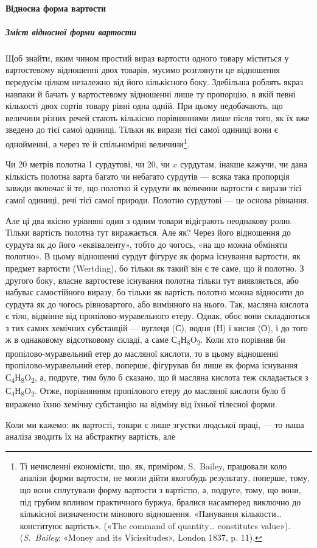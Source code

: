 
\paragraph{Відносна форма вартости}

\subparagraph{Зміст відносної форми вартости}

Щоб знайти, яким чином простий вираз вартости одного товару
міститься у вартостевому відношенні двох товарів, мусимо
розглянути це відношення передусім цілком незалежно від його
кількісного боку. Здебільша роблять якраз навпаки й бачать у
вартостевому відношенні лише ту пропорцію, в якій певні кількості
двох сортів товару рівні одна одній. При цьому недобачають,
що величини різних речей стають кількісно порівнянними
лише після того, як їх вже зведено до тієї самої одиниці. Тільки
як вирази тієї самої одиниці вони є однойменні, а через те й спільномірні
величини\footnote{
Ті нечисленні економісти, що, як, приміром, S.~Bailey, працювали
коло аналізи форми вартости, не могли дійти якогобудь результату,
поперше, тому, що вони сплутували форму вартости з вартістю, а, подруге,
тому, що вони, під грубим впливом практичного буржуа, бралися насамперед
виключно до кількісної визначености мінового відношення. «Панування
кількости\dots{} конституює вартість». («The command of quantity\dots{}
constitutes value»). (\emph{S.~Bailey}: «Money and its Vicissitudes», London
1837, p. 11).
}.

Чи 20 метрів полотна \deq{} 1 сурдутові, чи 20, чи $x$ сурдутам,
інакше кажучи, чи дана кількість полотна варта багато чи небагато
сурдутів — всяка така пропорція завжди включає й те, що
полотно й сурдути як величини вартости є вирази тієї самої одиниці,
речі тієї самої природи. Полотно \deq{} сурдутові — це основа
рівнання.

Але ці два якісно урівняні один з одним товари відіграють
неоднакову ролю. Тільки вартість полотна тут виражається. Але
як? Через його відношення до сурдута як до його «еквіваленту»,
тобто до чогось, «на що можна обміняти полотно». В цьому відношенні
сурдут фігурує як форма існування вартости, як предмет
вартости (Wertding), бо тільки як такий він є те саме, що й полотно.
З другого боку, власне вартостеве існування полотна
тільки тут виявляється, або набуває самостійного виразу, бо
тільки як вартість полотно можна відносити до сурдута як до
чогось рівновартого, або вимінного на нього. Так, масляна кислота
є тіло, відмінне від пропілово-муравельного етеру. Однак, обоє
вони складаються з тих самих хемічних субстанцій — вуглеця
(С), водня (Н) і кисня (О), і до того ж в однаковому відсотковому
складі, а саме С\textsubscript{4}Н\textsubscript{8}O\textsubscript{2}.
Коли хто порівняв би пропілово-муравельний
етер до масляної кислоти, то в цьому відношенні пропілово-муравельний
етер, поперше, фігурував би лише як форма
існування С\textsubscript{4}Н\textsubscript{8}O\textsubscript{2},
а, подруге, тим було б сказано, що й масляна
кислота теж складається з С\textsubscript{4}Н\textsubscript{8}O\textsubscript{2}.
Отже, порівнянням пропілового
етеру до масляної кислоти було б виражено їхню хемічну
субстанцію на відміну від їхньої тілесної форми.

Коли ми кажемо: як вартості, товари є лише згустки людської
праці, — то наша аналіза зводить їх на абстрактну вартість, але
\parbreak{}  %
